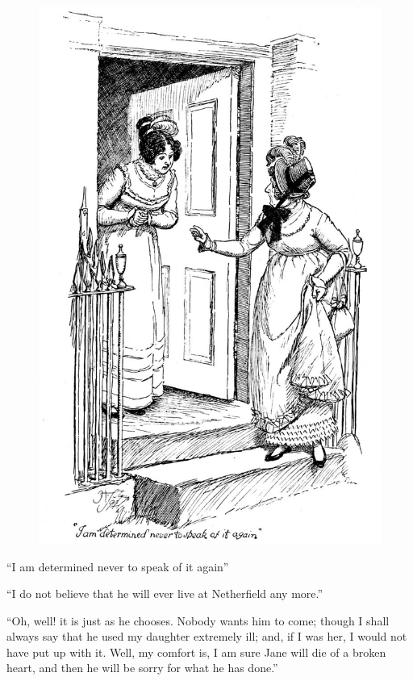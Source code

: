 \documentclass[10pt]{book}
\begin{document}
\begin{figure}[h]
\centering
\includegraphics[width=\linewidth]{images/i_312.jpg}
\end{figure}

      “I am determined never to speak of it again”
     

   “I do not believe that he will ever live at Netherfield any more.”
  

   “Oh, well! it is just as he chooses. Nobody wants him to come; though I
shall always say that he used my daughter extremely ill; and, if I was
her, I would not have put up with it. Well, my comfort is, I am sure
Jane will die of a broken heart, and then he will be sorry for what he
has done.”
  
\end{document}
